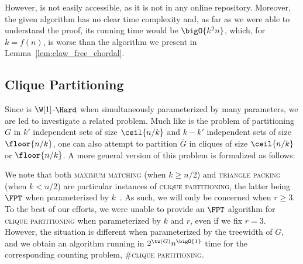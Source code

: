 However, \citep{claw_free_de_werra} is not easily accessible, as it is not in any online repository.
Moreover, the given algorithm has no clear time complexity and, as far as we were able to understand the proof, its running time would be $\bigO{k^2n}$, which, for $k = f(n)$, is worse than the algorithm we present in Lemma~\ref{lem:claw_free_chordal}.



\subsection{Clique Partitioning}

Since  is $\W[1]$-$\Hard$ when simultaneously parameterized by many parameters, we are led to investigate a related problem.
Much like  is the problem of partitioning $G$ in $k'$ independent sets of size $\ceil{n/k}$ and $k - k'$ independent sets of size $\floor{n/k}$, one can also attempt to partition $\overline{G}$ in cliques of size $\ceil{n/k}$ or $\floor{n/k}$.
A more general version of this problem is formalized as follows:


We note that both \textsc{maximum matching} (when $k \geq n/2$) and \textsc{triangle packing} (when $k < n/2$) are particular instances of \textsc{clique partitioning}, the latter being $\FPT$ when parameterized by $k$~\citep{triangle_packing}.
As such, we will only be concerned when $r \geq 3$.
To the best of our efforts, we were unable to provide an $\FPT$ algorithm for \textsc{clique partitioning} when parameterized by $k$ and $r$, even if we fix $r = 3$.
However, the situation is different when parameterized by the treewidth of $G$, and we obtain an algorithm running in $2^{\tw(G)}n^{\bigO{1}}$ time for the corresponding counting problem, \textsc{\#clique partitioning}.

